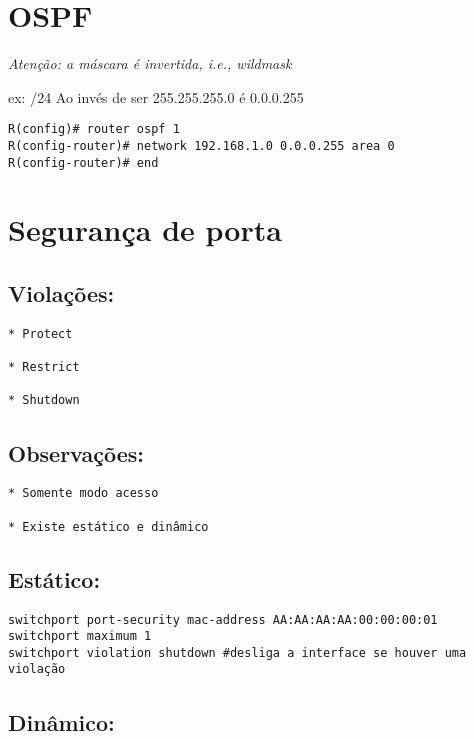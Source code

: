 \documentclass[]{article}
\begin{document}
\section{OSPF}\label{ospf}

\emph{Atenção: a máscara é invertida, i.e., wildmask}

ex: /24 Ao invés de ser 255.255.255.0 é 0.0.0.255

\begin{verbatim}
R(config)# router ospf 1
R(config-router)# network 192.168.1.0 0.0.0.255 area 0
R(config-router)# end
\end{verbatim}

\section{Segurança de porta}\label{seguranuxe7a-de-porta}

\subsection{Violações:}\label{violauxe7uxf5es}

\begin{verbatim}
* Protect

* Restrict

* Shutdown
\end{verbatim}

\subsection{Observações:}\label{observauxe7uxf5es}

\begin{verbatim}
* Somente modo acesso

* Existe estático e dinâmico
\end{verbatim}

\subsection{Estático:}\label{estuxe1tico}

\begin{verbatim}
switchport port-security mac-address AA:AA:AA:AA:00:00:00:01
switchport maximum 1
switchport violation shutdown #desliga a interface se houver uma violação
\end{verbatim}

\subsection{Dinâmico:}\label{dinuxe2mico}
\end{document}
